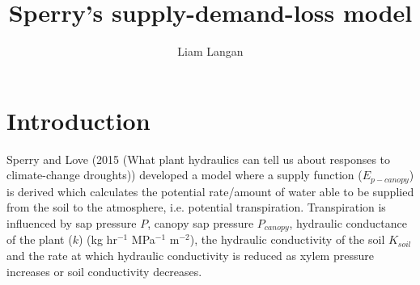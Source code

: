 \documentclass[a4paper]{article}\usepackage[]{graphicx}\usepackage[]{color}
\begin{document}
\title{Sperry's supply-demand-loss model}
\author{Liam Langan}
\maketitle


\section{Introduction}
Sperry and Love (2015 (What plant hydraulics can tell us about responses to climate-change droughts)) developed a model where a supply function ($E_{p-canopy}$) is derived which calculates the potential rate/amount of water able to be supplied from the soil to the atmosphere, i.e. potential transpiration. Transpiration is influenced by sap pressure $P$,  canopy sap pressure $P_{canopy}$, hydraulic conductance of the plant ($k$) (kg hr$^{-1}$ MPa$^{-1}$ m$^{-2}$), the hydraulic conductivity of the soil $K_{soil}$ and the rate at which hydraulic conductivity is reduced as xylem pressure increases or soil conductivity decreases.   
\end{document}
